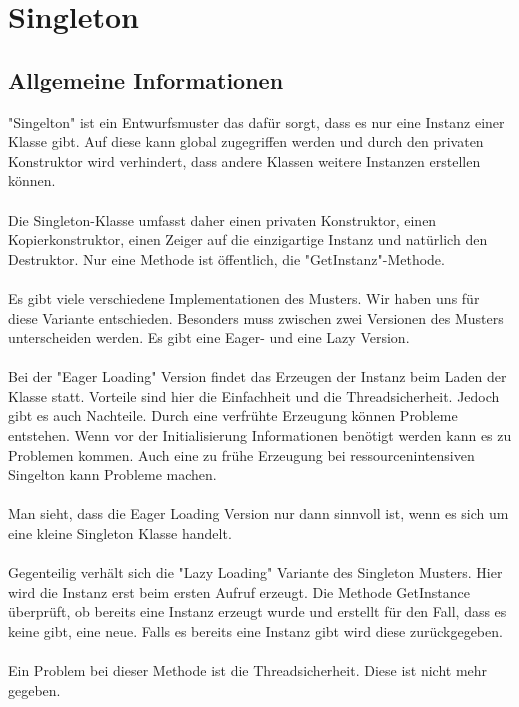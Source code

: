 \chapter{Singleton}

\section{Allgemeine Informationen}

"Singelton" ist ein Entwurfsmuster das dafür sorgt, dass es nur eine Instanz einer Klasse gibt. Auf diese kann global zugegriffen werden und durch den privaten Konstruktor wird verhindert, dass andere Klassen weitere Instanzen erstellen können.
\\
\\
Die Singleton-Klasse umfasst daher einen privaten Konstruktor, einen Kopierkonstruktor, einen Zeiger auf die einzigartige Instanz und natürlich den Destruktor. Nur eine Methode ist öffentlich, die "GetInstanz"-Methode.
\\
\\
Es gibt viele verschiedene Implementationen des Musters. Wir haben uns für diese Variante entschieden. Besonders muss zwischen zwei Versionen des Musters unterscheiden werden. Es gibt eine Eager- und eine Lazy Version.
\\
\\
Bei der "Eager Loading" Version findet das Erzeugen der Instanz beim Laden der Klasse statt. Vorteile sind hier die Einfachheit und die Threadsicherheit. Jedoch gibt es auch Nachteile. Durch eine verfrühte Erzeugung können Probleme entstehen. Wenn vor der Initialisierung Informationen benötigt werden kann es zu Problemen kommen. Auch eine zu frühe Erzeugung bei ressourcenintensiven Singelton kann Probleme machen.
\\
\\
Man sieht, dass die Eager Loading Version nur dann sinnvoll ist, wenn es sich um eine kleine Singleton Klasse handelt.
\\
\\
Gegenteilig verhält sich die "Lazy Loading" Variante des Singleton Musters. Hier wird die Instanz erst beim ersten Aufruf erzeugt. Die Methode GetInstance überprüft, ob bereits eine Instanz erzeugt wurde und erstellt für den Fall, dass es keine gibt, eine neue. Falls es bereits eine Instanz gibt wird diese zurückgegeben.
\\
\\
Ein Problem bei dieser Methode ist die Threadsicherheit. Diese ist nicht mehr gegeben. \\

